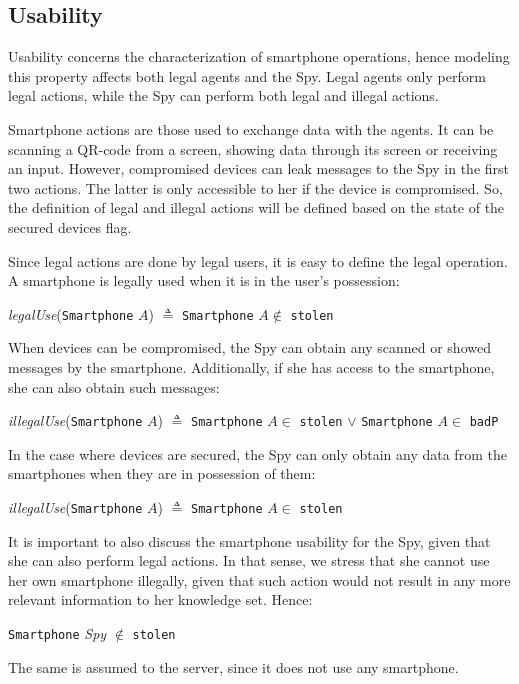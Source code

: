 \subsection{Usability}
\label{ssec:usability}
Usability concerns the characterization of smartphone operations, hence modeling this property affects both legal agents and the Spy. Legal agents only perform legal actions, while the Spy can perform both legal and illegal actions.

Smartphone actions are those used to exchange data with the agents. It can be scanning a QR-code from a screen, showing data through its screen or receiving an input. However, compromised devices can leak messages to the Spy in the first two actions. The latter is only accessible to her if the device is compromised. So, the definition of legal and illegal actions will be defined based on the state of the secured devices flag.

Since legal actions are done by legal users, it is easy to define the legal operation. A smartphone is legally used when it is in the user's possession:
%
\begin{center}
  \textit{legalUse}(\texttt{Smartphone} $A$) $\triangleq$ \texttt{Smartphone} $A \notin$ \texttt{stolen}
\end{center}
%
When devices can be compromised, the Spy can obtain any scanned or showed messages by the smartphone. Additionally, if she has access to the smartphone, she can also obtain such messages:
% 
\begin{center}
  \textit{illegalUse}(\texttt{Smartphone} $A$) $\triangleq$ \texttt{Smartphone} $A \in$ \texttt{stolen} $\vee$ \texttt{Smartphone} $A \in$ \texttt{badP}
\end{center}
% 
In the case where devices are secured, the Spy can only obtain any data from the smartphones when they are in possession of them:
%
\begin{center}
  \textit{illegalUse}(\texttt{Smartphone} $A$) $\triangleq$ \texttt{Smartphone} $A \in$ \texttt{stolen}
\end{center}
%
It is important to also discuss the smartphone usability for the Spy, given that she can also perform legal actions. In that sense, we stress that she cannot use her own smartphone illegally, given that such action would not result in any more relevant information to her knowledge set. Hence:
%
\begin{center}
  \texttt{Smartphone} \textit{Spy} $\notin$ \texttt{stolen}
\end{center}
%
The same is assumed to the server, since it does not use any smartphone.



